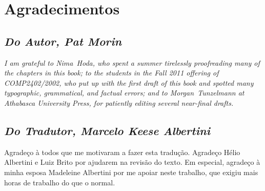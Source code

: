 \chapter*{Agradecimentos}

\section*{\emph{Do Autor, Pat Morin}}

\emph{I am grateful to Nima~Hoda, who spent a summer tirelessly proofreading
many of the chapters in this book; to the students in the Fall 2011
offering of COMP2402/2002, who put up with the first draft of this book
and spotted many typographic, grammatical, and factual errors; and to
Morgan~Tunzelmann at Athabasca University Press, for patiently editing
several near-final drafts.}

\section*{\emph{Do Tradutor, Marcelo Keese Albertini }}

Agradeço à todos que me motivaram a fazer esta tradução. Agradeço Hélio Albertini e Luiz Brito por ajudarem na revisão do texto.
Em especial, agradeço à minha esposa Madeleine Albertini por me apoiar neste trabalho, que exigiu mais horas de trabalho do que o normal.

